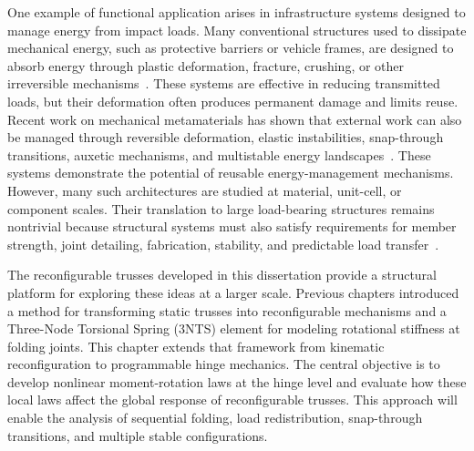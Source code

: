 One example of functional application arises in infrastructure systems designed to manage energy from impact loads. Many conventional structures used to dissipate mechanical energy, such as protective barriers or vehicle frames, are designed to absorb energy through plastic deformation, fracture, crushing, or other irreversible mechanisms~\cite{lu2003energy}. These systems are effective in reducing transmitted loads, but their deformation often produces permanent damage and limits reuse. Recent work on mechanical metamaterials has shown that external work can also be managed through reversible deformation, elastic instabilities, snap-through transitions, auxetic mechanisms, and multistable energy landscapes~\cite{shim2013harnessing, babaee20133d, peretz2023multistable, peretz2022metafluid, zhang2021architected, ha2018design, zhang2019energy, shan2015multistable}. These systems demonstrate the potential of reusable energy-management mechanisms. However, many such architectures are studied at material, unit-cell, or component scales. Their translation to large load-bearing structures remains nontrivial because structural systems must also satisfy requirements for member strength, joint detailing, fabrication, stability, and predictable load transfer~\cite{yoon2016challenges, fischer2020mechanical}.

The reconfigurable trusses developed in this dissertation provide a structural platform for exploring these ideas at a larger scale. Previous chapters introduced a method for transforming static trusses into reconfigurable mechanisms and a Three-Node Torsional Spring (3NTS) element for modeling rotational stiffness at folding joints. This chapter extends that framework from kinematic reconfiguration to programmable hinge mechanics. The central objective is to develop nonlinear moment-rotation laws at the hinge level and evaluate how these local laws affect the global response of reconfigurable trusses. This approach will enable the analysis of sequential folding, load redistribution, snap-through transitions, and multiple stable configurations.

